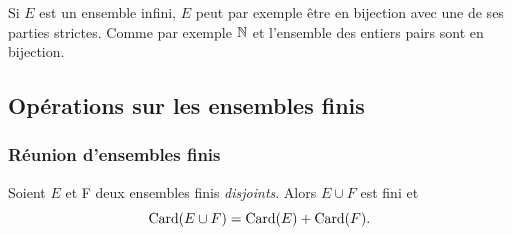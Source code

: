 Si \(E\) est un ensemble infini, \(E\) peut par exemple être en bijection 
avec une de ses parties strictes. Comme par exemple \(\mathbb{N}\) et l'ensemble des 
entiers pairs sont en bijection.

\subsection{Opérations sur les ensembles finis}

\subsubsection{Réunion d'ensembles finis}

\begin{prop}\label{prop:reunionfindis}
  Soient \(E\) et F deux ensembles finis \emph{disjoints}. Alors \(E\cup F\) 
  est fini et \begin{equation}
    \operatorname{Card}(E\cup F)=\operatorname{Card}(E)+\operatorname{Card}(F).
  \end{equation}
\end{prop}

